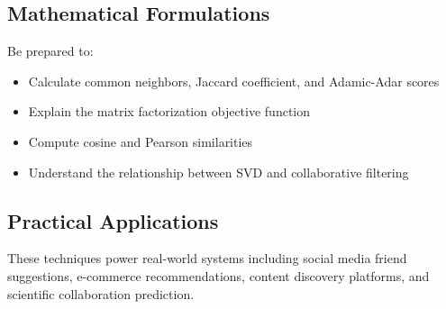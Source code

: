 \documentclass[11pt,a4paper]{article}
\begin{document}
\subsection{Mathematical Formulations}
Be prepared to:
\begin{itemize}
\item Calculate common neighbors, Jaccard coefficient, and Adamic-Adar scores
\item Explain the matrix factorization objective function
\item Compute cosine and Pearson similarities
\item Understand the relationship between SVD and collaborative filtering
\end{itemize}

\subsection{Practical Applications}
These techniques power real-world systems including social media friend suggestions, e-commerce recommendations, content discovery platforms, and scientific collaboration prediction.
\end{document}
